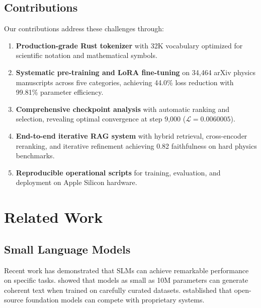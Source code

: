 \documentclass[11pt,a4paper]{article}
\theoremstyle{plain}
\theoremstyle{definition}
\newcommand{\loss}{\mathcal{L}}
\begin{document}
\subsection{Contributions}

Our contributions address these challenges through:

\begin{enumerate}[leftmargin=*,itemsep=2pt]
    \item \textbf{Production-grade Rust tokenizer} with 32K vocabulary
    optimized for scientific notation and mathematical symbols.
    
    \item \textbf{Systematic pre-training and LoRA fine-tuning} on
    34,464 arXiv physics manuscripts across five categories, achieving
    44.0\% loss reduction with 99.81\% parameter efficiency.
    
    \item \textbf{Comprehensive checkpoint analysis} with automatic
    ranking and selection, revealing optimal convergence at step 9,000
    ($\loss = 0.0060005$).
    
    \item \textbf{End-to-end iterative RAG system} with hybrid retrieval,
    cross-encoder reranking, and iterative refinement achieving 0.82
    faithfulness on hard physics benchmarks.
    
    \item \textbf{Reproducible operational scripts} for training,
    evaluation, and deployment on Apple Silicon hardware.
\end{enumerate}

\section{Related Work}

\subsection{Small Language Models}

Recent work has demonstrated that SLMs can achieve remarkable
performance on specific tasks. \citet{eldan2023tinystories} showed
that models as small as 10M parameters can generate coherent text
when trained on carefully curated datasets.
\citet{touvron2023llama} established that open-source foundation
models can compete with proprietary systems.
\end{document}
